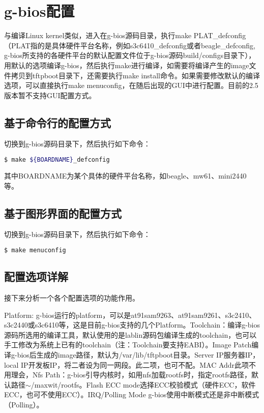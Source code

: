 \section{g-bios配置}
与编译Linux kernel类似，进入在g-bios源码目录，执行make PLAT\_defconfig（PLAT指的是具体硬件平台名称，例如s3c6410\_defconfig或者beagle\_defconfig, g-bios所支持的各硬件平台的默认配置文件位于g-bios源码build/configs目录下），用默认的选项编译g-bios，然后执行make进行编译，如需要将编译产生的image文件拷贝到tftpboot目录下，还需要执行make install命令。如果需要修改默认的编译选项，可以直接执行make menuconfig，在随后出现的GUI中进行配置。目前的2.5版本暂不支持GUI配置方式。

\subsection{基于命令行的配置方式}
切换到g-bios源码目录下，然后执行如下命令：
\begin{lstlisting}[language=bash, numbers=none]
$ make ${BOARDNAME}_defconfig
\end{lstlisting}
其中BOARDNAME为某个具体的硬件平台名称，如beagle、mw61、mini2440等。

\subsection{基于图形界面的配置方式}
切换到g-bios源码目录下，然后执行如下命令：
\begin{lstlisting}[language=bash, numbers=none]
$ make menuconfig
\end{lstlisting}

\subsection{配置选项详解}
接下来分析一个各个配置选项的功能作用。

Platform:	g-bios运行的platform，可以是at91sam9263、at91sam9261、s3c2410、s3c2440或s3c6410等，这是目前g-bios支持的几个Platform。Toolchain：编译g-bios源码所选用的编译工具，默认使用的是lablin源码包编译生成的toolchain，也可以手工修改为系统上已有的toolchain（注：Toolchain要支持EABI）。Image Patch编译g-bios后生成的image路径，默认为/var/lib/tftpboot目录。Server IP服务器IP，local IP开发板IP，将二者设为同一网段。此二项，也可不配。MAC Addr此项不用理会，Nfs Path：g-bios引导内核时，如用nfs加载rootfs时，指定rootfs路径，默认路径$\sim$/maxwit/rootfs。Flash ECC mode选择ECC校验模式（硬件ECC，软件ECC，也可不使用ECC）。IRQ/Polling Mode g-bios使用中断模式还是非中断模式（Polling）。

